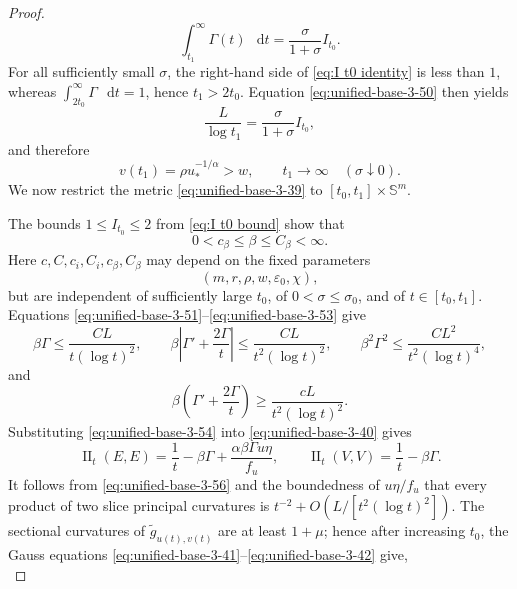 \documentclass[11pt,reqno]{amsart}
\theoremstyle{definition}
\numberwithin{equation}{section}
\DeclareMathOperator{\II}{II}
\newcommand{\dd}{\mathop{}\!\mathrm d}
\begin{document}
\begin{proof}
\begin{equation}
 \int_{t_1}^{\infty}\Gamma(t)\,\dd t
 =\frac{\sigma}{1+\sigma}I_{t_0}.
\end{equation}
For all sufficiently small \(\sigma\), the right-hand side of \eqref{eq:I t0 identity} is less than \(1\), whereas
\(\int_{2t_0}^{\infty}\Gamma\,\dd t=1\), hence \(t_1>2t_0\).
Equation \eqref{eq:unified-base-3-50} then yields
\[
 \frac{L}{\log t_1}
 =\frac{\sigma}{1+\sigma}I_{t_0},
\]
and therefore
\begin{equation}
v(t_1)=\rho u_*^{-1/\alpha}>w,\qquad
                         t_1\longrightarrow\infty
                         \quad(\sigma\downarrow0).                \label{eq:unified-base-3-55}
\end{equation}
We now restrict the metric \eqref{eq:unified-base-3-39} to
$[t_0,t_1]\times\mathbb S^m$.

The bounds \(1\leq I_{t_0}\leq2\) from \eqref{eq:I t0 bound} show that
\[
 0<c_\beta\leq\beta\leq C_\beta<\infty .
\]
Here \(c,C,c_i,C_i,c_\beta,C_\beta\) may depend on the fixed parameters
\[
 (m,r,\rho,w,\varepsilon_0,\chi),
\]
but are independent of sufficiently large \(t_0\), of
\(0<\sigma\leq\sigma_0\), and of \(t\in[t_0,t_1]\).
Equations \eqref{eq:unified-base-3-51}--\eqref{eq:unified-base-3-53} give
\begin{equation}
\beta\Gamma\le\frac{CL}{t(\log t)^2},\qquad
 \beta\left|\Gamma'+\frac{2\Gamma}{t}\right|
 \le\frac{CL}{t^2(\log t)^2},\qquad
 \beta^2\Gamma^2\le\frac{CL^2}{t^2(\log t)^4},                \label{eq:unified-base-3-56}
\end{equation}
and
\begin{equation}
\beta\left(\Gamma'+\frac{2\Gamma}{t}\right)
 \ge\frac{cL}{t^2(\log t)^2}.                                   \label{eq:unified-base-3-57}
\end{equation}
Substituting \eqref{eq:unified-base-3-54} into
\eqref{eq:unified-base-3-40} gives
\begin{equation}
\II_t(E,E)=\frac1t-\beta\Gamma
       +\frac{\alpha\beta\Gamma u\eta}{f_u},
 \qquad
 \II_t(V,V)=\frac1t-\beta\Gamma.                              \label{eq:unified-base-3-58}
\end{equation}
It follows from \eqref{eq:unified-base-3-56} and the boundedness of
$u\eta/f_u$ that every product of two slice principal curvatures is
$t^{-2}+O(L/[t^2(\log t)^2])$.  The sectional curvatures of
$\widetilde g_{u(t),v(t)}$ are at least $1+\mu$; hence after increasing $t_0$, the Gauss
equations \eqref{eq:unified-base-3-41}--\eqref{eq:unified-base-3-42}
give, 
\begin{equation}

\end{equation}
\end{proof}
\end{document}
